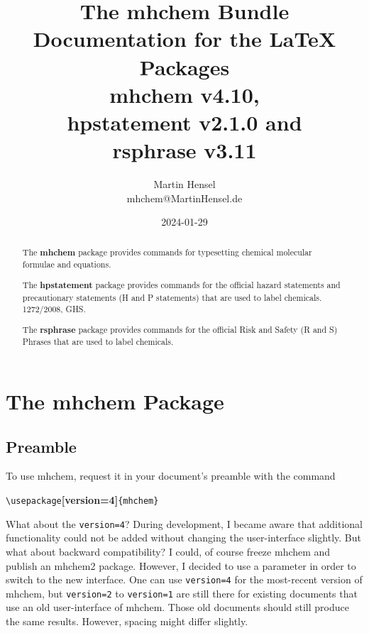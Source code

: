 \documentclass[a4paper,notitlepage,parskip=half]{scrreprt}
\newenvironment{annotation}{\bgroup\footnotesize}{\par\egroup}
\begin{document}
\title{%
  The mhchem Bundle\\[0.3em]
  \Large\textmd{%
    Documentation for the \LaTeX{} Packages\\
    mhchem v4.10,\\%
    hpstatement v2.1.0 and\\
    rsphrase v3.11}%
}
\author{%
  Martin Hensel\\
  mhchem\makebox[0pt][l]{\textcolor{white}{NOSPAM}}@MartinHensel\makebox[1pt][l]{\textcolor{white}{.}}.de%
}
\date{%
  2024-01-29%
}
\maketitle

\vfill

\begin{abstract}
  \noindent
  The \textbf{mhchem} package provides commands for typesetting chemical
  molecular formulae and equations.

  \medskip
  \noindent The \textbf{hpstatement} package provides commands for the
  official hazard statements and precautionary statements (H and P statements)
  that are used to label chemicals. 1272/2008, GHS.

  \medskip
  \noindent
  The \textbf{rsphrase} package provides commands for the official Risk and
  Safety (R and S) Phrases that are used to label chemicals.
\end{abstract}



\clearpage
\tableofcontents



\clearpage
\chapter{The mhchem Package}


\section{Preamble}

To use mhchem, request it in your document's preamble with the command

{\color{mhchem}\Large\verb|\usepackage|{\ttfamily\bfseries [version=4]}\verb|{mhchem}|}
\marginpar{\Large !}

\begin{annotation}
What about the \verb|version=4|? During development, I became aware that additional functionality could not be added without changing the user-interface slightly. But what about backward compatibility? I could, of course freeze mhchem and publish an mhchem2 package. However, I decided to use a parameter in order to switch to the new interface. One can use \verb|version=4| for the most-recent version of mhchem, but \verb|version=2| to \verb|version=1| are still there for existing documents that use an old user-interface of mhchem. Those old documents should still produce the same results. However, spacing might differ slightly.
\end{annotation}
\end{document}
